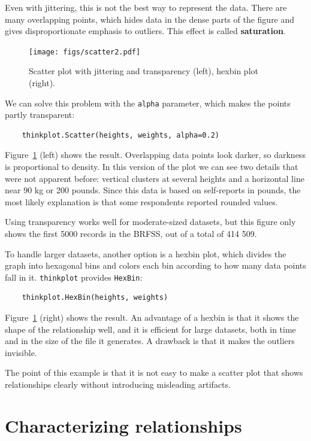 \documentclass[12pt]{book}
\theoremstyle{exercise}
\begin{document}
Even with jittering, this is not the best way to represent the data.
There are many overlapping points, which hides data
in the dense parts of the figure and gives disproportionate emphasis
to outliers.  This effect is called {\bf saturation}.%
%

\begin{figure}
\centerline{\texttt{[image: figs/scatter2.pdf]}}
\caption{Scatter plot with jittering and transparency (left),
hexbin plot (right).}%
\label{scatter2}
\end{figure}

We can solve this problem with the {\tt alpha} parameter, which makes
the points partly transparent:
%
\begin{verbatim}
    thinkplot.Scatter(heights, weights, alpha=0.2)
\end{verbatim}
%
Figure~\ref{scatter2} (left) shows the result.  Overlapping data
points look darker, so darkness is proportional to density.  In this
version of the plot we can see two details that were not apparent before:
vertical clusters at several heights and a horizontal line near 90 kg
or 200 pounds.  Since this data is based on self-reports in pounds,
the most likely explanation is that some respondents reported
rounded values.%
%
%

Using transparency works well for moderate-sized datasets, but this
figure only shows the first 5000 records in the BRFSS, out of a total
of 414 509.%
%

To handle larger datasets, another option is a hexbin plot, which
divides the graph into hexagonal bins and colors each bin according to
how many data points fall in it.  {\tt thinkplot} provides 
{\tt HexBin}:
%
\begin{verbatim}
    thinkplot.HexBin(heights, weights)
\end{verbatim}
%
Figure~\ref{scatter2} (right) shows the result.  An advantage of a
hexbin is that it shows the shape of the relationship well, and it is
efficient for large datasets, both in time and in the size of the file
it generates.  A drawback is that it makes the outliers invisible.%
%

The point of this example is that it is
not easy to make a scatter plot that shows relationships clearly
without introducing misleading artifacts.%


\section{Characterizing relationships}%
\label{characterizing}
\end{document}
